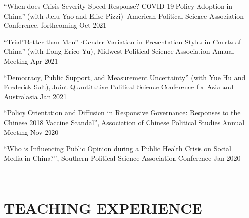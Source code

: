 \documentclass[10.5pt,]{article}
\providecommand{\tightlist}{%
	\setlength{\itemsep}{0pt}\setlength{\parskip}{0pt}}
\renewenvironment{itemize}{
	\begin{list}{}{
			\setlength{\leftmargin}{1.5em}
		}
	}{
	\end{list}
}
\begin{document}
 \begin{itemize}
 \tightlist
 \item
   ``When does Crisis Severity Speed Response? COVID-19 Policy Adoption
   in China'' (with Jielu Yao and Elise Pizzi), American Political
   Science Association Conference, forthcoming \hfill Oct 2021
 \item
   ``Trial''Better than Men'' :Gender Variation in Presentation Styles
   in Courts of China'' (with Dong Erico Yu), Midwest Political Science
   Association Annual Meeting \hfill  Apr 2021
 \item
   ``Democracy, Public Support, and Measurement Uncertainty'' (with Yue
   Hu and Frederick Solt), Joint Quantitative Political Science
   Conference for Asia and Australasia \hfill  Jan 2021
 \item
   ``Policy Orientation and Diffusion in Responsive Governance:
   Responses to the Chinese 2018 Vaccine Scandal'', Association of
   Chinese Political Studies Annual Meeting \hfill Nov 2020
 \item
   ``Who is Influencing Public Opinion during a Public Health Crisis on
   Social Media in China?'', Southern Political Science Association
   Conference \hfill  Jan 2020
 \end{itemize}

 ~

 \hypertarget{teaching-experience}{%
 \section{TEACHING EXPERIENCE}\label{teaching-experience}}
\end{document}

